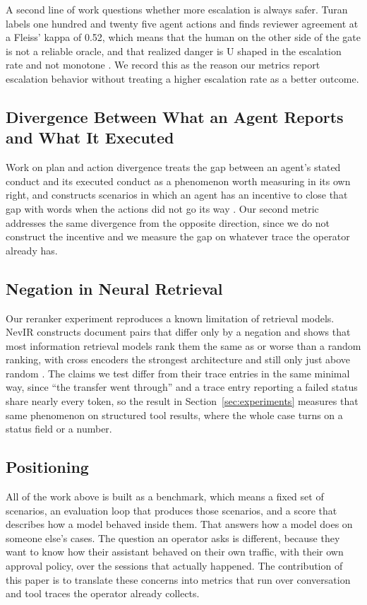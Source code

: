 \documentclass[11pt,a4paper]{article}
\begin{document}
A second line of work questions whether more escalation is always safer. Turan
labels one hundred and twenty five agent actions and finds reviewer agreement at a
Fleiss' kappa of 0.52, which means that the human on the other side of the gate is
not a reliable oracle, and that realized danger is U shaped in the escalation rate
and not monotone \citep{turan2026oversight}. We record this as the reason our
metrics report escalation behavior without treating a higher escalation rate as a
better outcome.

\subsection{Divergence Between What an Agent Reports and What It Executed}

Work on plan and action divergence treats the gap between an agent's stated conduct
and its executed conduct as a phenomenon worth measuring in its own right, and
constructs scenarios in which an agent has an incentive to close that gap with words
when the actions did not go its way \citep{bu2026spade}. Our second metric addresses the same
divergence from the opposite direction, since we do not construct the incentive and we
measure the gap on whatever trace the operator already has.

\subsection{Negation in Neural Retrieval}

Our reranker experiment reproduces a known limitation of retrieval models. NevIR
constructs document pairs that differ only by a negation and shows that most
information retrieval models rank them the same as or worse than a random ranking,
with cross encoders the strongest architecture and still only just above random
\citep{weller2024nevir}. The claims we test differ from
their trace entries in the same minimal way, since ``the transfer went through'' and
a trace entry reporting a failed status share nearly every token, so the result in
Section~\ref{sec:experiments} measures that same phenomenon on structured tool
results, where the whole case turns on a status field or a number.

\subsection{Positioning}

All of the work above is built as a benchmark, which means a fixed set of scenarios,
an evaluation loop that produces those scenarios, and a score that describes how a
model behaved inside them. That answers how a model does on someone else's cases.
The question an operator asks is different, because they want to know how their
assistant behaved on their own traffic, with their own approval policy, over the
sessions that actually happened. The contribution of this paper is to translate
these concerns into metrics that run over conversation and tool traces the operator
already collects.
\end{document}
